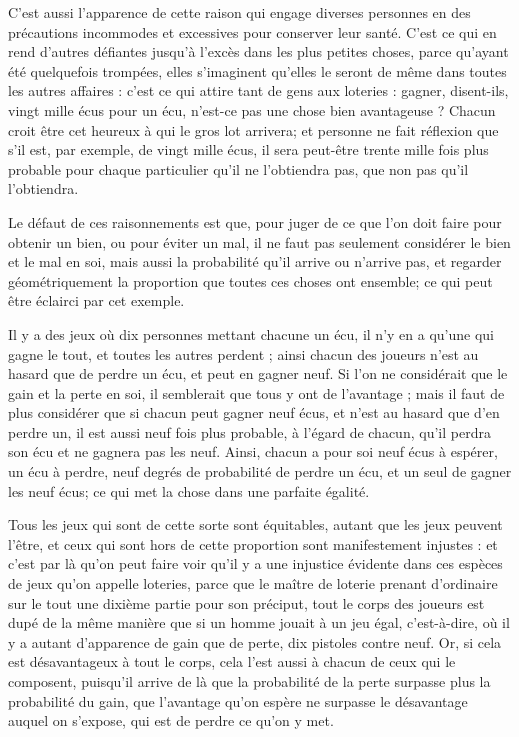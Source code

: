 C'est aussi l'apparence de cette raison qui engage diverses personnes en des précautions incommodes et excessives pour conserver leur santé. C'est ce qui en rend d'autres défiantes jusqu'à l'excès dans les plus petites choses, parce qu'ayant été quelquefois trompées, elles s'imaginent qu'elles le seront de même dans toutes les autres affaires : c'est ce qui attire tant de gens aux loteries : gagner, disent-ils, vingt mille écus pour un écu, n'est-ce pas une chose bien avantageuse ? Chacun croit être cet heureux à qui le gros lot arrivera; et personne ne fait réflexion que s'il est, par exemple, de vingt mille écus, il sera peut-être trente mille fois plus probable pour chaque particulier qu'il ne l'obtiendra pas, que non pas qu'il l'obtiendra.

Le défaut de ces raisonnements est que, pour juger de ce que l'on doit faire pour obtenir un bien, ou pour éviter un mal, il ne faut pas seulement considérer le bien et le mal en soi, mais aussi la probabilité qu'il arrive ou n'arrive pas, et regarder géométriquement la proportion que toutes ces choses ont ensemble; ce qui peut être éclairci par cet exemple.

Il y a des jeux où dix personnes mettant chacune un écu, il n'y en a qu'une qui gagne le tout, et toutes les autres perdent ; ainsi chacun des joueurs n'est au hasard que de perdre un écu, et peut en gagner neuf. Si l'on ne considérait que le gain et la perte en soi, il semblerait que tous y ont de l'avantage ; mais il faut de plus considérer que si chacun peut gagner neuf écus, et n'est au hasard que d'en perdre un, il est aussi neuf fois plus probable, à l'égard de chacun, qu'il perdra son écu et ne gagnera pas les neuf. Ainsi, chacun a pour soi neuf écus à espérer, un écu à perdre, neuf degrés de probabilité de perdre un écu, et un seul de gagner les neuf écus; ce qui met la chose dans une parfaite égalité.

Tous les jeux qui sont de cette sorte sont équitables, autant que les jeux peuvent l'être, et ceux qui sont hors de cette proportion sont manifestement injustes : et c'est par là qu'on peut faire voir qu'il y a une injustice évidente dans ces espèces de jeux qu'on appelle loteries, parce que le maître de loterie prenant d'ordinaire sur le tout une dixième partie pour son préciput, tout le corps des joueurs est dupé de la même manière que si un homme jouait à un jeu égal, c'est-à-dire, où il y a autant d'apparence de gain que de perte, dix pistoles contre neuf. Or, si cela est désavantageux à tout le corps, cela l'est aussi à chacun de ceux qui le composent, puisqu'il arrive de là que la probabilité de la perte surpasse plus la probabilité du gain, que l'avantage qu'on espère ne surpasse le désavantage auquel on s'expose, qui est de perdre ce qu'on y met.

